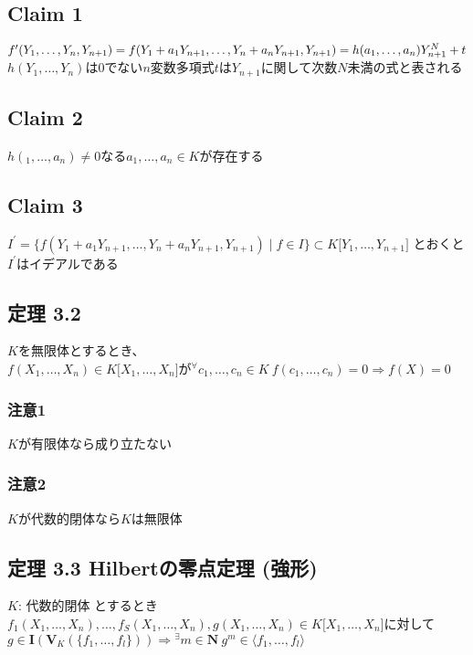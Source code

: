 \documentclass[12pt,a4paper]{article}
\begin{document}
\subsection*{Claim 1}
  $f^\prime (Y_1, \ldots , Y_n, Y_{n+1}) = \\
  f(Y_1 + a_1 Y_{n+1}, \ldots, Y_n + a_n Y_{n+1}, Y_{n+1}) = h(a_1, \ldots, a_n)Y_{n+1}^N + t$ \\
  $h(Y_1, \ldots, Y_n) $は$0$でない$n$変数多項式$t$は$Y_{n+1}$に関して次数$N$未満の式と表される
\subsection*{Claim 2}
  $h(_1, \ldots, a_n) \neq 0 $なる$a_1, \ldots, a_n \in K$が存在する
\subsection*{Claim 3}
  $I^\prime = \lbrace f( Y_1 + a_1 Y_{n+1}, \ldots , Y_n + a_n Y_{n+1}, Y_{n+1}) \mid f \in I \rbrace \subset K \lbrack Y_1, \ldots, Y_{n+1} \rbrack$
  とおくと$I^\prime$はイデアルである \\

\subsection*{定理 3.2}
  $K$を無限体とするとき、\\
  $f(X_1, \ldots, X_n) \in K \lbrack X_1, \ldots , X_n \rbrack$が${}^\forall c_1, \ldots , c_n \in K \ f(c_1, \ldots, c_n) = 0 \Rightarrow f(X) = 0$
  \subsubsection*{注意1}
    $K$が有限体なら成り立たない
  \subsubsection*{注意2}
    $K$が代数的閉体なら$K$は無限体

\subsection*{定理 3.3 Hilbertの零点定理 (強形)}
  $K$: 代数的閉体 とするとき\\
  $f_1(X_1, \ldots, X_n) , \ldots, f_S(X_1, \ldots, X_n), g(X_1, \ldots, X_n) \in K \lbrack X_1, \ldots, X_n \rbrack$に対して\\
  $g\in\mathbf{I}(\mathbf{V}_K(\lbrace f_1, \ldots, f_l\rbrace)) \Rightarrow {}^\exists m \in \mathbf{N} \ g^m \in \langle f_1, \ldots, f_l \rangle$
\end{document}
